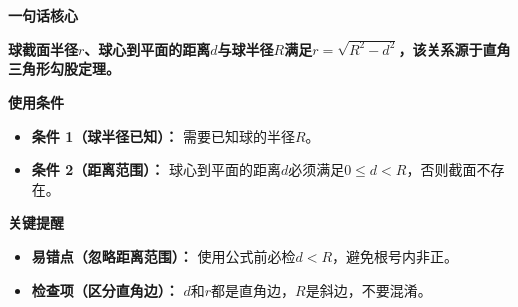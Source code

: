 \begin{summarybox}
	\textbf{\textcolor{CSummary}{一句话核心}}

	\textbf{球截面半径$r$、球心到平面的距离$d$与球半径$R$满足$r=\sqrt{R^{2}-d^{2}}$，该关系源于直角三角形勾股定理。}

	\medskip
	\textbf{\textcolor{CSummary}{使用条件}}
	\begin{itemize}[leftmargin=*, itemsep=0.5em, topsep=0.4em]
		\item \textbf{条件 1（球半径已知）：} 需要已知球的半径$R$。
		\item \textbf{条件 2（距离范围）：} 球心到平面的距离$d$必须满足$0\le d<R$，否则截面不存在。
	\end{itemize}

	\medskip
	\textbf{\textcolor{CSummary}{关键提醒}}
	\begin{itemize}[leftmargin=*, itemsep=0.5em, topsep=0.4em]
		\item \textbf{易错点（忽略距离范围）：} 使用公式前必检$d<R$，避免根号内非正。
		\item \textbf{检查项（区分直角边）：} $d$和$r$都是直角边，$R$是斜边，不要混淆。
	\end{itemize}
\end{summarybox}
